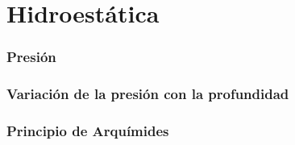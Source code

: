 \section{Hidroestática}


\subsubsection*{Presión}


\subsubsection*{Variación de la presión con la profundidad} 


\subsubsection*{Principio de Arquímides}
